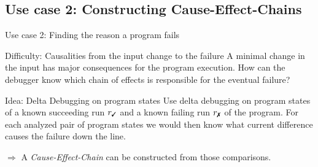 \subsection{Use case 2: Constructing Cause-Effect-Chains}



\begin{frame}{Use case 2: Finding the reason a program fails}

	\begin{alertblock}{Difficulty: Causalities from the input change to the failure}
		A minimal change in the input has major consequences for the program execution. How can the debugger know which chain of effects is responsible for the eventual failure?
	\end{alertblock}

	\pause
	\bigskip
	
	\begin{exampleblock}{Idea: Delta Debugging on program states}
		Use delta debugging on program states of a known succeeding run $r_\cmark$ and a known failing run $r_\xmark$ of the program. For each analyzed pair of program states we would then know what current difference causes the failure down the line.

		\bigskip

		$\Rightarrow$ A \textit{Cause-Effect-Chain} can be constructed from those comparisons.
	\end{exampleblock}	

\end{frame}


